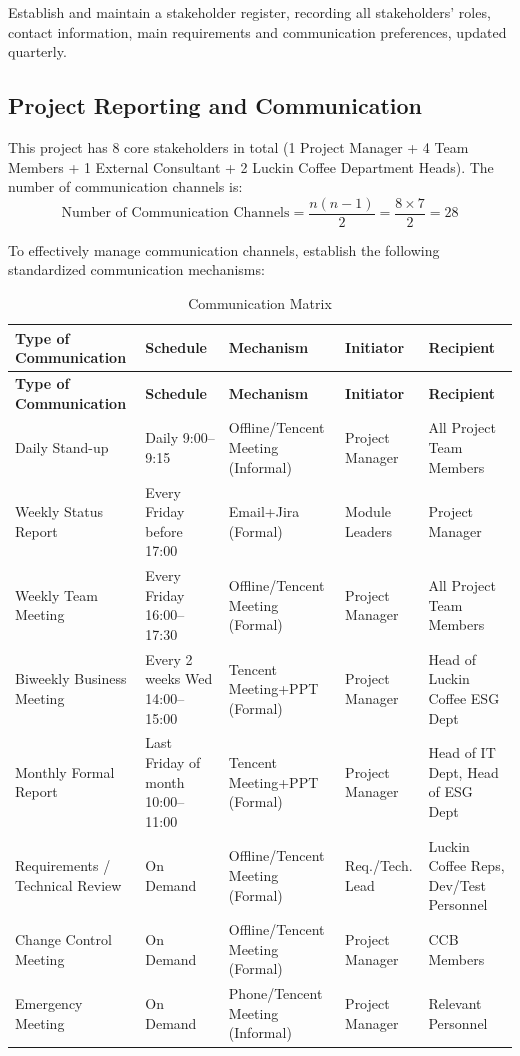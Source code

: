 \documentclass[12pt,a4paper]{article}
\begin{document}
\noindent Establish and maintain a stakeholder register, recording all stakeholders' roles, contact information, main requirements and communication preferences, updated quarterly.

\subsection{Project Reporting and Communication}

This project has 8 core stakeholders in total (1 Project Manager + 4 Team Members + 1 External Consultant + 2 Luckin Coffee Department Heads). The number of communication channels is:
\[
\text{Number of Communication Channels} = \frac{n(n-1)}{2} = \frac{8 \times 7}{2} = 28
\]

To effectively manage communication channels, establish the following standardized communication mechanisms:

{\footnotesize
\begin{longtable}{@{}L{2.2cm} L{2.5cm} >{\raggedright\arraybackslash}p{4cm} L{2.2cm} >{\raggedright\arraybackslash}p{3cm}@{}}
\caption{Communication Matrix}\label{tab:comm_matrix}\\
\toprule
\textbf{Type of Communication}
  & \textbf{Schedule}
  & \textbf{Mechanism}
  & \textbf{Initiator}
  & \textbf{Recipient}\\
\midrule
\endfirsthead
\toprule
\textbf{Type of Communication}
  & \textbf{Schedule}
  & \textbf{Mechanism}
  & \textbf{Initiator}
  & \textbf{Recipient}\\
\midrule
\endhead
Daily Stand-up & Daily 9:00--9:15 & Offline/Tencent Meeting (Informal) & Project Manager & All Project Team Members\\
Weekly Status Report & Every Friday before 17:00 & Email+Jira (Formal) & Module Leaders & Project Manager\\
Weekly Team Meeting & Every Friday 16:00--17:30 & Offline/Tencent Meeting (Formal) & Project Manager & All Project Team Members\\
Biweekly Business Meeting & Every 2 weeks Wed 14:00--15:00 & Tencent Meeting+PPT (Formal) & Project Manager & Head of Luckin Coffee ESG Dept\\
Monthly Formal Report & Last Friday of month 10:00--11:00 & Tencent Meeting+PPT (Formal) & Project Manager & Head of IT Dept, Head of ESG Dept\\
Requirements / Technical Review & On Demand & Offline/Tencent Meeting (Formal) & Req./Tech. Lead & Luckin Coffee Reps, Dev/Test Personnel\\
Change Control Meeting & On Demand & Offline/Tencent Meeting (Formal) & Project Manager & CCB Members\\
Emergency Meeting & On Demand & Phone/Tencent Meeting (Informal) & Project Manager & Relevant Personnel\\
\bottomrule
\end{longtable}
}
\end{document}
